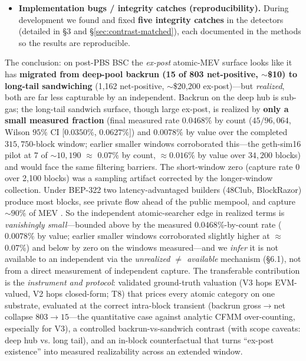 \documentclass[11pt]{article}
\begin{document}
\begin{itemize}
    point-identified, structurally-reachable estimand---the value a builder leaves by
    \emph{dropping} public, orthogonal, profitable opportunities---is \textbf{$\hat D = 0$}
    after a chain-verified settle window; \textbf{$99.6\%$} of apparent public ``drops''
    were merely \emph{delayed inclusion} (mined a few blocks later), not censorship. The
    public residual is empty too.
  \item \textbf{Implementation bugs / integrity catches (reproducibility).} During
    development we found and fixed \textbf{five integrity catches} in the detectors
    (detailed in \S3 and \S\ref{sec:contrast-matched}), each documented in the methods
    so the results are reproducible.
\end{itemize}

The conclusion: on post-PBS BSC the \emph{ex-post} atomic-MEV surface looks like it
has \textbf{migrated from deep-pool backrun (15 of 803 net-positive, $\sim$\$10) to
long-tail sandwiching} (1{,}162 net-positive, $\sim$\$20{,}200 ex-post)---but
\emph{realized}, both are far less capturable by an independent. Backrun on the deep hub
is sub-gas; the long-tail sandwich surface, though large ex-post, is realized by
\textbf{only a small measured fraction} (final measured rate $0.0468\%$ by count ($45/96{,}064$, Wilson $95\%$ CI [$0.0350\%$, $0.0627\%$]) and $0.0078\%$ by value over the completed $315{,}750$-block window; earlier smaller windows corroborated this---the geth-sim16 pilot at $7$ of
$\sim$$10{,}190$ $\approx$ $0.07\%$ by count, $\approx$$0.016\%$ by value over
$34{,}200$ blocks) and would face the same filtering barriers. The short-window zero
(capture rate 0 over 2{,}100 blocks) was a sampling artifact corrected by the
longer-window collection. Under BEP-322 two
latency-advantaged builders (48Club, BlockRazor) produce most blocks, see private
flow ahead of the public mempool, and capture $\sim$$90\%$ of MEV
\cite{bep322,wang2025binance}. So the independent atomic-searcher edge in realized terms
is \emph{vanishingly small}---bounded above by the measured $0.0468\%$-by-count
rate ($0.0078\%$ by value; earlier smaller windows corroborated slightly higher at $\approx$0.07\%) and below by zero on the windows measured---and we \emph{infer} it is not available to an independent via the
\emph{unrealized $\neq$ available} mechanism (\S6.1), not from a direct measurement of
independent capture. The transferable
contribution is the
\emph{instrument and protocol}: validated ground-truth valuation (V3 hops EVM-valued, V2 hops closed-form; T8) that prices
every atomic category on one substrate, evaluated at the correct intra-block
transient (backrun gross$\to$net collapse $803 \to 15$---the quantitative case
against analytic CFMM over-counting, especially for V3), a controlled
backrun-vs-sandwich contrast (with scope caveats: deep hub vs. long tail),
and an in-block counterfactual that turns ``ex-post existence'' into measured
realizability across an extended window.
\end{document}
